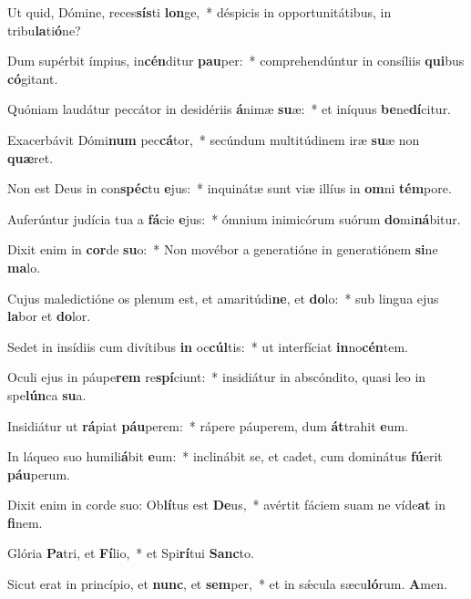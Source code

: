 \item Ut quid, Dómine, reces\textbf{sís}ti \textbf{lon}ge,~* déspicis in opportunitátibus, in tribu\textbf{la}ti\textbf{ó}ne?
\item Dum supérbit ímpius, in\textbf{cén}ditur \textbf{pau}per:~* comprehendúntur in consíliis \textbf{qui}bus \textbf{có}gitant.
\item Quóniam laudátur peccátor in desidériis \textbf{á}nimæ \textbf{su}æ:~* et iníquus \textbf{be}ne\textbf{dí}citur.
\item Exacerbávit Dómi\textbf{num} pec\textbf{cá}tor,~* secúndum multitúdinem iræ \textbf{su}æ non \textbf{quæ}ret.
\item Non est Deus in con\textbf{spéc}tu \textbf{e}jus:~* inquinátæ sunt viæ illíus in \textbf{om}ni \textbf{tém}pore.
\item Auferúntur judícia tua a \textbf{fá}cie \textbf{e}jus:~* ómnium inimicórum suórum \textbf{do}mi\textbf{ná}bitur.
\item Dixit enim in \textbf{cor}de \textbf{su}o:~* Non movébor a generatióne in generatiónem \textbf{si}ne \textbf{ma}lo.
\item Cujus maledictióne os plenum est, et amaritúdi\textbf{ne}, et \textbf{do}lo:~* sub lingua ejus \textbf{la}bor et \textbf{do}lor.
\item Sedet in insídiis cum divítibus \textbf{in} oc\textbf{cúl}tis:~* ut interfíciat \textbf{in}no\textbf{cén}tem.
\item Oculi ejus in páupe\textbf{rem} re\textbf{spí}ciunt:~* insidiátur in abscóndito, quasi leo in spe\textbf{lún}ca \textbf{su}a.
\item Insidiátur ut \textbf{rá}piat \textbf{páu}perem:~* rápere páuperem, dum \textbf{át}trahit \textbf{e}um.
\item In láqueo suo humili\textbf{á}bit \textbf{e}um:~* inclinábit se, et cadet, cum dominátus \textbf{fú}erit \textbf{páu}perum.
\item Dixit enim in corde suo: Ob\textbf{lí}tus est \textbf{De}us,~* avértit fáciem suam ne víde\textbf{at} in \textbf{fi}nem.
\item Glória \textbf{Pa}tri, et \textbf{Fí}lio,~* et Spi\textbf{rí}tui \textbf{Sanc}to.
\item Sicut erat in princípio, et \textbf{nunc}, et \textbf{sem}per,~* et in sǽcula sæcu\textbf{ló}rum. \textbf{A}men.
